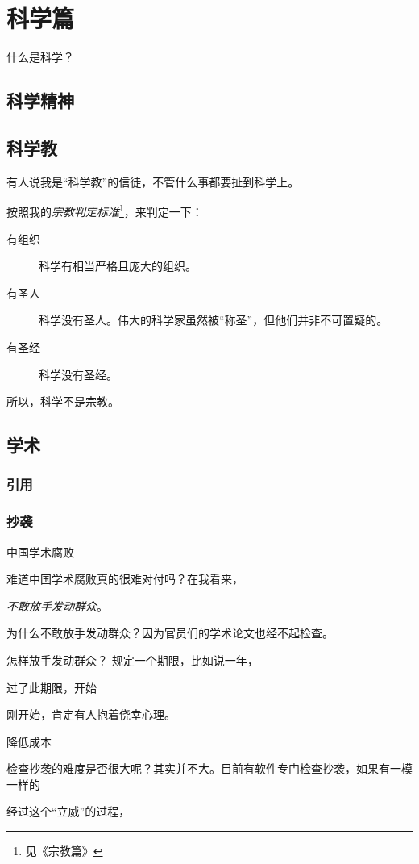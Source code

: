 \chapter{科学篇}
什么是科学？

\section{科学精神}

\section{科学教}
有人说我是“科学教”的信徒，不管什么事都要扯到科学上。

按照我的\textit{宗教判定标准}\footnote{见《宗教篇》}，来判定一下：
\begin{description}
\item[有组织] 科学有相当严格且庞大的组织。
\item[有圣人] 科学没有圣人。伟大的科学家虽然被“称圣”，但他们并非不可置疑的。
\item[有圣经] 科学没有圣经。
\end{description}

所以，科学不是宗教。

\section{学术}
\subsection{引用}

\subsection{抄袭}
中国学术腐败

难道中国学术腐败真的很难对付吗？在我看来，

\textit{不敢放手发动群众}。

为什么不敢放手发动群众？因为官员们的学术论文也经不起检查。

怎样放手发动群众？
规定一个期限，比如说一年，

过了此期限，开始

刚开始，肯定有人抱着侥幸心理。

降低成本

检查抄袭的难度是否很大呢？其实并不大。目前有软件专门检查抄袭，如果有一模一样的

经过这个“立威”的过程，


